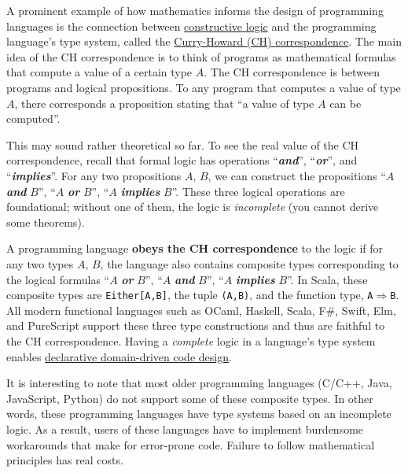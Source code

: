 A prominent example of how mathematics informs the design of programming
languages is the connection between \href{https://en.wikipedia.org/wiki/Intuitionistic_logic}{constructive logic}
and the programming language's type system, called the \href{https://en.wikipedia.org/wiki/Curry\%E2\%80\%93Howard_correspondence}{Curry-Howard (CH) correspondence}.
The main idea of the CH correspondence
is to think of programs as mathematical formulas that compute a value
of a certain type $A$. The CH correspondence is between programs
and logical propositions. To any program that computes a value of
type $A$, there corresponds a proposition stating that ``a value
of type $A$ can be computed''.

This may sound rather theoretical so far. To see the real value of
the CH correspondence, recall that formal logic has operations ``\textbf{\emph{and}}'',
``\textbf{\emph{or}}'', and ``\textbf{\emph{implies}}''. For any
two propositions $A$, $B$, we can construct the propositions ``$A$
\textbf{\emph{and}} $B$'', ``$A$ \textbf{\emph{or}} $B$'', ``$A$
\textbf{\emph{implies}} $B$''. These three logical operations are
foundational; without one of them, the logic is \emph{incomplete}
(you cannot derive some theorems).

A programming language \textbf{obeys the CH correspondence}
to the logic if for any two types $A$, $B$, the language also contains
composite types corresponding to the logical formulas ``$A$ \textbf{\emph{or}}
$B$'', ``$A$ \textbf{\emph{and}} $B$'', ``$A$ \textbf{\emph{implies}}
$B$''. In Scala, these composite types are \texttt{Either{[}A,B{]}},
the tuple \texttt{(A,B)}, and the function type, \texttt{A$\Rightarrow$B}.
All modern functional languages such as OCaml, Haskell, Scala, F\#,
Swift, Elm, and PureScript support these three type constructions
and thus are faithful to the CH correspondence. Having a \emph{complete}
logic in a language's type system enables \href{https://fsharpforfunandprofit.com/ddd/}{declarative domain-driven code design}.

It is interesting to note that most older programming languages (C/C++,
Java, JavaScript, Python) do not support some of these composite types.
In other words, these programming languages have type systems based
on an incomplete logic. As a result, users of these languages have
to implement burdensome workarounds that make for error-prone code.
Failure to follow mathematical principles has real costs.

